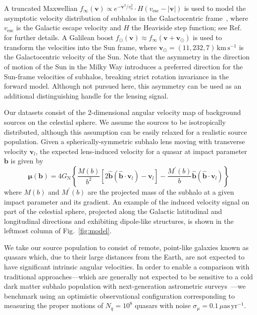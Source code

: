 \documentclass[preprint]{article}
\begin{document}
A truncated Maxwellian $f_{\infty}(\mathbf{v})\propto e^{-\mathbf{v}^{2} / v_{0}^{2}}\cdot H(v_\mathrm{esc} - |\mathbf{v}|)$ is used to model the asymptotic velocity distribution of subhalos in the Galactocentric frame~\cite{1939isss.book.....C,Lisanti:2016jxe}, where $v_\mathrm{esc}$ is the Galactic escape velocity and $H$ the Heaviside step function; see Ref.~\cite{Mishra-Sharma:2020ynk} for further details. A Galilean boost $f_{\odot}(\mathbf{v}) \approx f_{\infty}\left(\mathbf{v}+\mathbf{v}_{\odot}\right)$ is used to transform the velocities into the Sun frame, where $\mathbf{v}_{\odot} = (11, 232, 7)\,\mathrm{km}\,\mathrm{s}^{-1}$ is the Galactocentric velocity of the Sun. Note that the asymmetry in the direction of motion of the Sun in the Milky Way introduces a preferred direction for the Sun-frame velocities of subhalos, breaking strict rotation invariance in the forward model. Although not pursued here, this asymmetry can be used as an additional distinguishing handle for the lensing signal.

Our datasets consist of the 2-dimensional angular velocity map of background sources on the celestial sphere. We assume the sources to be isotropically distributed, although this assumption can be easily relaxed for a realistic source population.
Given a spherically-symmetric subhalo lens moving with transverse velocity $\mathbf{v}_{l}$, the expected lens-induced velocity for a quasar at impact parameter $\mathbf{b}$ is given by~\cite{VanTilburg:2018ykj}
\begin{equation}
    \boldsymbol{\mu}(\mathbf{b})=4 G_{\mathrm{N}}\left\{\frac{M(b)}{b^{2}}\left[2 \hat{\mathbf{b}}\left(\hat{\mathbf{b}} \cdot \mathbf{v}_{l}\right)-\mathbf{v}_{l}\right]-\frac{M^{\prime}(b)}{b} \hat{\mathbf{b}}\left(\hat{\mathbf{b}} \cdot \mathbf{v}_{l}\right)\right\}
\end{equation}
where $M(b)$ and $M^{\prime}(b)$ are the projected mass of the subhalo at a given impact parameter and its gradient. An example of the induced velocity signal on part of the celestial sphere, projected along the Galactic latitudinal and longitudinal directions and exhibiting dipole-like structures, is shown in the leftmost column of Fig.~\ref{fig:model}.

We take our source population to consist of remote, point-like galaxies known as quasars which, due to their large distances from the Earth, are not expected to have significant intrinsic angular velocities. In order to enable a comparison with traditional approaches---which are generally not expected to be sensitive to a cold dark matter subhalo population with next-generation astrometric surveys~\cite{VanTilburg:2018ykj,Mishra-Sharma:2020ynk}---we benchmark using an optimistic observational configuration corresponding to measuring the proper motions of $N_q = 10^8$ quasars with noise $\sigma_{\mu} = 0.1\,\mu\mathrm{as}\,\mathrm{yr}^{-1}$.
\end{document}
